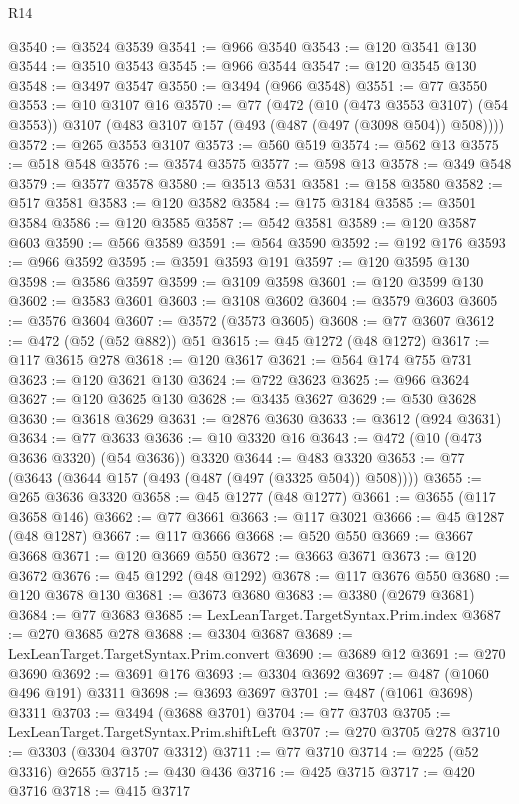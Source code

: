 \begin{lexlean}{R14}
\begin{coremodule}
{{{{{{{{{{{{{{{{{{{{{{{{{{{{{{{{{{{{{{{{{{{{{{{{{{{{{{{{{{{{{{{{{{{{{{{{{{{{{{{{{{{{{{{{{{{{{{{{{{{{{{{{{{@3540 := @3524 @3539
@3541 := @966 @3540
@3543 := @120 @3541 @130
@3544 := @3510 @3543
@3545 := @966 @3544
@3547 := @120 @3545 @130
@3548 := @3497 @3547
@3550 := @3494 (@966 @3548)
@3551 := @77 @3550
@3553 := @10 @3107 @16
@3570 := @77
    (@472
      (@10 (@473 @3553 @3107) (@54 @3553))
      @3107
      (@483 @3107 @157 (@493 (@487 (@497 (@3098 @504)) @508))))
@3572 := @265 @3553 @3107
@3573 := @560 @519
@3574 := @562 @13
@3575 := @518 @548
@3576 := @3574 @3575
@3577 := @598 @13
@3578 := @349 @548
@3579 := @3577 @3578
@3580 := @3513 @531
@3581 := @158 @3580
@3582 := @517 @3581
@3583 := @120 @3582
@3584 := @175 @3184
@3585 := @3501 @3584
@3586 := @120 @3585
@3587 := @542 @3581
@3589 := @120 @3587 @603
@3590 := @566 @3589
@3591 := @564 @3590
@3592 := @192 @176
@3593 := @966 @3592
@3595 := @3591 @3593 @191
@3597 := @120 @3595 @130
@3598 := @3586 @3597
@3599 := @3109 @3598
@3601 := @120 @3599 @130
@3602 := @3583 @3601
@3603 := @3108 @3602
@3604 := @3579 @3603
@3605 := @3576 @3604
@3607 := @3572 (@3573 @3605)
@3608 := @77 @3607
@3612 := @472 (@52 (@52 @882)) @51
@3615 := @45 @1272 (@48 @1272)
@3617 := @117 @3615 @278
@3618 := @120 @3617
@3621 := @564 @174 @755 @731
@3623 := @120 @3621 @130
@3624 := @722 @3623
@3625 := @966 @3624
@3627 := @120 @3625 @130
@3628 := @3435 @3627
@3629 := @530 @3628
@3630 := @3618 @3629
@3631 := @2876 @3630
@3633 := @3612 (@924 @3631)
@3634 := @77 @3633
@3636 := @10 @3320 @16
@3643 := @472 (@10 (@473 @3636 @3320) (@54 @3636)) @3320
@3644 := @483 @3320
@3653 := @77 (@3643 (@3644 @157 (@493 (@487 (@497 (@3325 @504)) @508))))
@3655 := @265 @3636 @3320
@3658 := @45 @1277 (@48 @1277)
@3661 := @3655 (@117 @3658 @146)
@3662 := @77 @3661
@3663 := @117 @3021
@3666 := @45 @1287 (@48 @1287)
@3667 := @117 @3666
@3668 := @520 @550
@3669 := @3667 @3668
@3671 := @120 @3669 @550
@3672 := @3663 @3671
@3673 := @120 @3672
@3676 := @45 @1292 (@48 @1292)
@3678 := @117 @3676 @550
@3680 := @120 @3678 @130
@3681 := @3673 @3680
@3683 := @3380 (@2679 @3681)
@3684 := @77 @3683
@3685 := LexLeanTarget.TargetSyntax.Prim.index
@3687 := @270 @3685 @278
@3688 := @3304 @3687
@3689 := LexLeanTarget.TargetSyntax.Prim.convert
@3690 := @3689 @12
@3691 := @270 @3690
@3692 := @3691 @176
@3693 := @3304 @3692
@3697 := @487 (@1060 @496 @191) @3311
@3698 := @3693 @3697
@3701 := @487 (@1061 @3698) @3311
@3703 := @3494 (@3688 @3701)
@3704 := @77 @3703
@3705 := LexLeanTarget.TargetSyntax.Prim.shiftLeft
@3707 := @270 @3705 @278
@3710 := @3303 (@3304 @3707 @3312)
@3711 := @77 @3710
@3714 := @225 (@52 @3316) @2655
@3715 := @430 @436
@3716 := @425 @3715
@3717 := @420 @3716
@3718 := @415 @3717
}}}}}}}}}}}}}}}}}}}}}}}}}}}}}}}}}}}}}}}}}}}}}}}}}}}}}}}}}}}}}}}}}}}}}}}}}}}}}}}}}}}}}}}}}}}}}}}}}}}}}}}}}}
\end{coremodule}
\end{lexlean}
